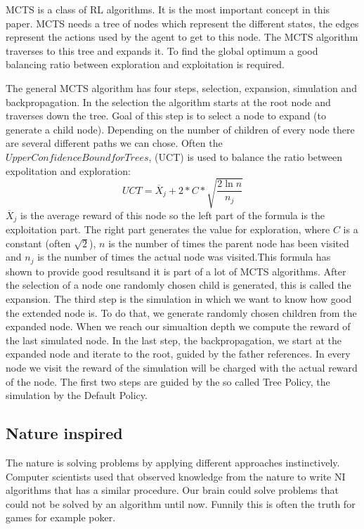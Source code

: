 \ac{MCTS} is a class of \ac{RL} algorithms. It is the most important concept in this paper. \ac{MCTS} needs a tree of nodes which represent the different states, the edges represent the actions used by the agent to get to this node. The \ac{MCTS} algorithm traverses to this tree and expands it. To find the global optimum a good balancing ratio between exploration and exploitation is required. 



The general \ac{MCTS} algorithm has four steps, selection, expansion, simulation and backpropagation.
In the selection the algorithm starts at the root node and traverses down the tree. Goal of this step is to select a node to expand (to generate a child node). Depending on the number of children of every node there are several different paths we can chose. Often the $Upper Confidence Bound for Trees$, (UCT) is used to balance the ratio between expolitation and exploration:
\begin{equation}
	UCT = \overline{X}_j + 2 * C * \sqrt{\frac{2 \ln n}{n_j}}
\end{equation}
$\overline{X}_j$ is the average reward of this node so the left part of the formula is the exploitation part. The right part generates the value for exploration, where $C$ is a constant (often $\sqrt{2}$), $n$ is the number of times the parent node has been visited and $n_j$ is the number of times the actual node was visited.This formula has shown to provide good resultsand it is part of a lot of \ac{MCTS} algorithms.
After the selection of a node one randomly chosen child is generated, this is called the expansion.
The third step is the simulation in which we want to know how good the extended node is. To do that, we generate randomly chosen children from the expanded node. When we reach our simualtion depth we compute the reward of the last simulated node.
In the last step, the backpropagation, we start at the expanded node and iterate to the root, guided by the father references. In every node we visit the reward of the simulation will be charged with the actual reward of the node.
The first two steps are guided by the so called Tree Policy, the simulation by the Default Policy.

\subsection{Nature inspired} 
The nature is solving problems by applying different approaches instinctively. Computer scientists used that observed knowledge from the
nature to write \ac{NI} algorithms that has a similar procedure. Our brain could solve problems that could not be solved by an algorithm until now. Funnily this is often the truth for games for example poker.


